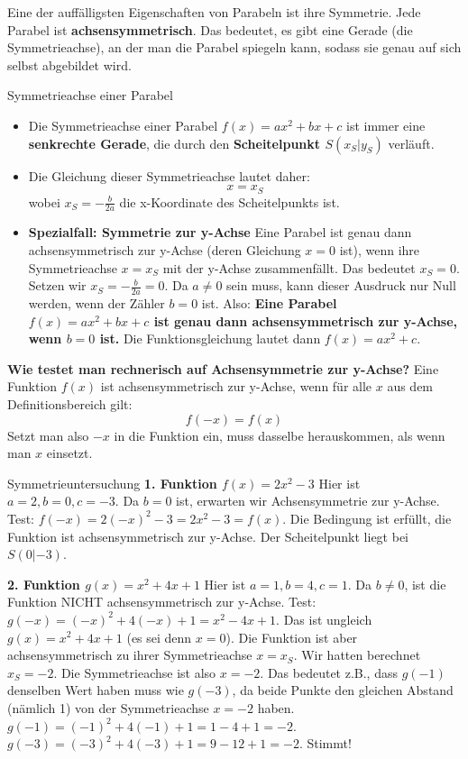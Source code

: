 Eine der auffälligsten Eigenschaften von Parabeln ist ihre Symmetrie. Jede Parabel ist \textbf{achsensymmetrisch}. Das bedeutet, es gibt eine Gerade (die Symmetrieachse), an der man die Parabel spiegeln kann, sodass sie genau auf sich selbst abgebildet wird.

\begin{merksatzumgebung}{Symmetrieachse einer Parabel}
\begin{itemize}
    \item Die Symmetrieachse einer Parabel $f(x)=ax^2+bx+c$ ist immer eine \textbf{senkrechte Gerade}, die durch den \textbf{Scheitelpunkt $S(x_S|y_S)$} verläuft.
    \item Die Gleichung dieser Symmetrieachse lautet daher: \[ x = x_S \] wobei $x_S = -\frac{b}{2a}$ die x-Koordinate des Scheitelpunkts ist.
    \item \textbf{Spezialfall: Symmetrie zur y-Achse}
        Eine Parabel ist genau dann achsensymmetrisch zur y-Achse (deren Gleichung $x=0$ ist), wenn ihre Symmetrieachse $x=x_S$ mit der y-Achse zusammenfällt. Das bedeutet $x_S=0$.
        Setzen wir $x_S = -\frac{b}{2a} = 0$. Da $a \neq 0$ sein muss, kann dieser Ausdruck nur Null werden, wenn der Zähler $b=0$ ist.
        Also: \textbf{Eine Parabel $f(x)=ax^2+bx+c$ ist genau dann achsensymmetrisch zur y-Achse, wenn $b=0$ ist.} Die Funktionsgleichung lautet dann $f(x)=ax^2+c$.
\end{itemize}
\end{merksatzumgebung}

\textbf{Wie testet man rechnerisch auf Achsensymmetrie zur y-Achse?}
Eine Funktion $f(x)$ ist achsensymmetrisch zur y-Achse, wenn für alle $x$ aus dem Definitionsbereich gilt:
\[ f(-x) = f(x) \]
Setzt man also $-x$ in die Funktion ein, muss dasselbe herauskommen, als wenn man $x$ einsetzt.

\begin{beispielumgebung}{Symmetrieuntersuchung}
\textbf{1. Funktion $f(x) = 2x^2 - 3$}
Hier ist $a=2, b=0, c=-3$. Da $b=0$ ist, erwarten wir Achsensymmetrie zur y-Achse.
Test: $f(-x) = 2(-x)^2 - 3 = 2x^2 - 3 = f(x)$.
Die Bedingung ist erfüllt, die Funktion ist achsensymmetrisch zur y-Achse. Der Scheitelpunkt liegt bei $S(0|-3)$.

\textbf{2. Funktion $g(x) = x^2 + 4x + 1$}
Hier ist $a=1, b=4, c=1$. Da $b \neq 0$, ist die Funktion NICHT achsensymmetrisch zur y-Achse.
Test: $g(-x) = (-x)^2 + 4(-x) + 1 = x^2 - 4x + 1$.
Das ist ungleich $g(x) = x^2+4x+1$ (es sei denn $x=0$).
Die Funktion ist aber achsensymmetrisch zu ihrer Symmetrieachse $x=x_S$. Wir hatten berechnet $x_S=-2$. Die Symmetrieachse ist also $x=-2$.
Das bedeutet z.B., dass $g(-1)$ denselben Wert haben muss wie $g(-3)$, da beide Punkte den gleichen Abstand (nämlich 1) von der Symmetrieachse $x=-2$ haben.
$g(-1) = (-1)^2+4(-1)+1 = 1-4+1 = -2$.
$g(-3) = (-3)^2+4(-3)+1 = 9-12+1 = -2$. Stimmt!
\end{beispielumgebung}

